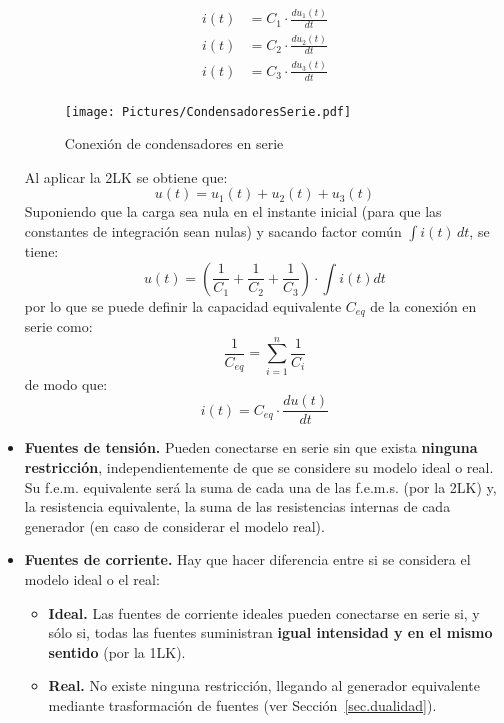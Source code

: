 \documentclass[11pt]{book} %
\numberwithin{dummy}{section}
\theoremstyle{ocrenumbox}
\theoremstyle{blacknumex}
\theoremstyle{blacknumbox}
\theoremstyle{ocrenum}
\begin{document}
\begin{itemize}
		\begin{align*}
			i(t) &= C_1 \cdot \frac{du_1(t)}{dt}\\
			i(t) &= C_2 \cdot \frac{du_2(t)}{dt}\\
			i(t) &= C_3 \cdot \frac{du_3(t)}{dt}\\
		\end{align*}
		\begin{figure}[htbp]
			\centering
			\texttt{[image: Pictures/CondensadoresSerie.pdf]}
			\caption{Conexión de condensadores en serie}
			\label{fig.condensadores-serie}
		\end{figure}
		Al aplicar la 2LK se obtiene que: 
		\begin{equation*}
			u(t) = u_1(t) + u_2(t) + u_3(t)
		\end{equation*}
		Suponiendo que la carga sea nula en el instante inicial (para que las constantes de integración sean nulas) y sacando factor común $\int i(t)\,dt$, se tiene:
		\begin{equation*}
			u(t)=\left(\dfrac{1}{C_1}+\dfrac{1}{C_2}+\dfrac{1}{C_3} \right)\cdot \int i(t) dt
		\end{equation*}
		por lo que se puede definir la capacidad equivalente $C_{eq}$ de la conexión en serie como:
		\begin{equation}
			\boxed{\dfrac{1}{C_{eq}} = \sum_{i = 1}^n \dfrac{1}{C_i}}
		\end{equation}
		de modo que:
		\begin{equation*}
			i(t) = C_{eq} \cdot \frac{du(t)}{dt}
		\end{equation*}
		\item \textbf{Fuentes de tensión.} Pueden conectarse en serie sin que exista \textbf{ninguna restricción}, independientemente de que se considere su modelo ideal o real. Su f.e.m. equivalente será la suma de cada una de las f.e.m.s. (por la 2LK) y, la resistencia equivalente, la suma de las resistencias internas de cada generador (en caso de considerar el modelo real).
		\item \textbf{Fuentes de corriente.} Hay que hacer diferencia entre si se considera el modelo ideal o el real:
		\begin{itemize}
			\item \textbf{Ideal.} Las fuentes de corriente ideales pueden conectarse en serie si, y sólo si, todas las fuentes suministran \textbf{igual intensidad y en el mismo sentido} (por la 1LK).
			\item \textbf{Real.} No existe ninguna restricción, llegando al generador equivalente mediante trasformación de fuentes (ver Sección~\ref{sec.dualidad}). 
		\end{itemize}
	\end{itemize}
	
\end{document}
